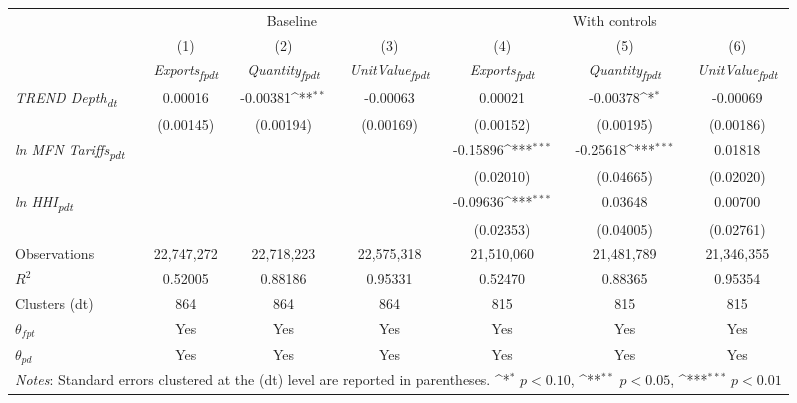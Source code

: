 {
\def\sym#1{\ifmmode^{#1}\else\(^{#1}\)\fi}
\begin{tabular}{l*{6}{c}}
\toprule
&\multicolumn{3}{c}{Baseline}&\multicolumn{3}{c}{With controls}\\\cmidrule(lr){2-4}\cmidrule(lr){5-7}
&(1)&(2)&(3)&(4)&(5)&(6)\\
&\textit{Exports\textsubscript{fpdt}}&\textit{Quantity\textsubscript{fpdt}}&\textit{UnitValue\textsubscript{fpdt}}&\textit{Exports\textsubscript{fpdt}}&\textit{Quantity\textsubscript{fpdt}}&\textit{UnitValue\textsubscript{fpdt}}\\
\midrule
\textit{TREND Depth\textsubscript{dt}} & 0.00016 & -0.00381\sym{**} & -0.00063 & 0.00021 & -0.00378\sym{*} & -0.00069\\
 & (0.00145) & (0.00194) & (0.00169) & (0.00152) & (0.00195) & (0.00186)\\
\addlinespace
\textit{ln MFN Tariffs\textsubscript{pdt}} &  &  &  & -0.15896\sym{***} & -0.25618\sym{***} & 0.01818\\
 &  &  &  & (0.02010) & (0.04665) & (0.02020)\\
\addlinespace
\textit{ln HHI\textsubscript{pdt}} &  &  &  & -0.09636\sym{***} & 0.03648 & 0.00700\\
 &  &  &  & (0.02353) & (0.04005) & (0.02761)\\
\midrule
Observations & 22,747,272 & 22,718,223 & 22,575,318 & 21,510,060 & 21,481,789 & 21,346,355\\
$R^{2}$ & 0.52005 & 0.88186 & 0.95331 & 0.52470 & 0.88365 & 0.95354\\
Clusters (dt) & 864 & 864 & 864 & 815 & 815 & 815\\
$\theta_{fpt}$ & Yes & Yes & Yes & Yes & Yes & Yes\\
$\theta_{pd}$ & Yes & Yes & Yes & Yes & Yes & Yes\\
\bottomrule
\multicolumn{7}{l}{\footnotesize \textit{Notes}: Standard errors clustered at the (dt) level are reported in parentheses. \sym{*} \(p<0.10\), \sym{**} \(p<0.05\), \sym{***} \(p<0.01\)}\\
\end{tabular}
}
